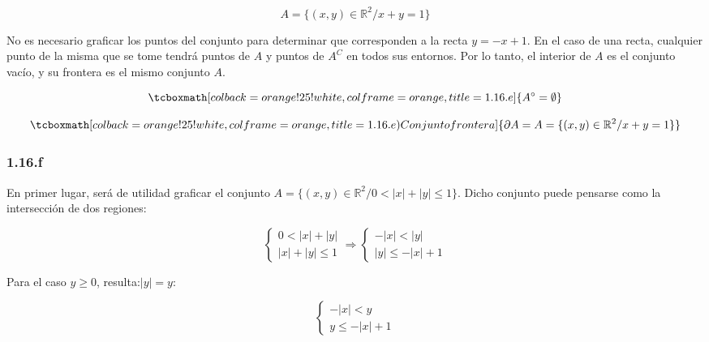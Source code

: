 \documentclass{article}
\renewcommand{\Bbb}{\mathbb}
\begin{document}
\begin{equation}
A = \{ (x, y) \in \Bbb R^2 / x + y = 1 \}
\end{equation}

No es necesario graficar los puntos del conjunto para determinar que corresponden a la recta $y = -x + 1$. En el caso de una recta, cualquier punto de la misma que se tome tendrá puntos de $A$ y puntos de $A^C$ en todos sus entornos. Por lo tanto, el interior de $A$ es el conjunto vacío, y su frontera es el mismo conjunto $A$.

\begin{equation}
\tcboxmath[colback=orange!25!white,colframe=orange,title=1.16.e]
{ A^{\circ} = \emptyset }
\end{equation}

\begin{equation}
\tcboxmath[colback=orange!25!white,colframe=orange,title=1.16.e) Conjunto frontera]
{ \partial{A} = A = \{ (x, y) \in \Bbb R^2 / x + y = 1 \} }
\end{equation}

\subsubsection*{1.16.f}
\label{subsubsec:1.16.f}

En primer lugar, será de utilidad graficar el conjunto $A = \{ (x,y) \in \Bbb R^2 / 0 < |x| + |y| \leq 1 \}$. Dicho conjunto puede pensarse como la intersección de dos regiones:

\begin{equation}
\left\{
\begin{array}{ll}
0 < |x| + |y| \\
|x| + |y| \leq 1
\end{array}
\right. \Rightarrow
\left\{
\begin{array}{ll}
-|x| < |y| \\
|y| \leq -|x| + 1
\end{array}
\right.
\end{equation}

Para el caso $y \geq 0$, resulta:$|y| = y$:

\begin{equation}
\left\{
\begin{array}{ll}
-|x| < y \\
y \leq -|x| + 1
\end{array}
\right.
\end{equation}
\end{document}
